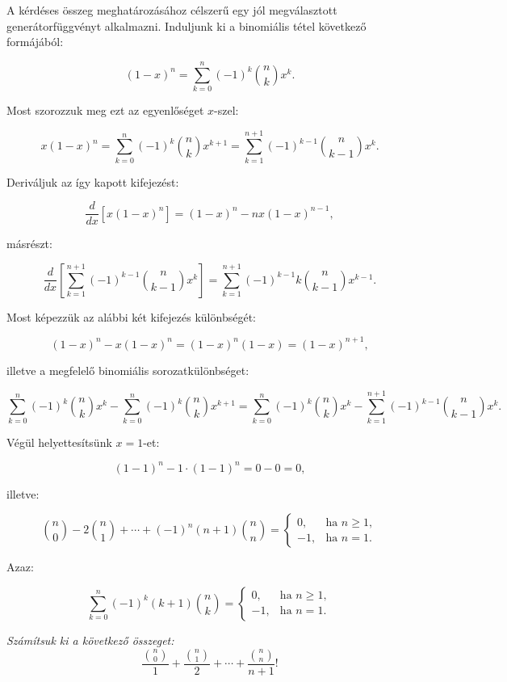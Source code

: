 \begin{solution}
A kérdéses összeg meghatározásához célszerű egy
jól megválasztott generátorfüggvényt alkalmazni. Induljunk ki a binomiális
tétel következő formájából:

\[
(1-x)^{n}=\sum_{k=0}^{n}(-1)^{k}\binom{n}{k}x^{k}.
\]

Most szorozzuk meg ezt az egyenlőséget $x$-szel:

\[
x(1-x)^{n}=\sum_{k=0}^{n}(-1)^{k}\binom{n}{k}x^{k+1}=\sum_{k=1}^{n+1}(-1)^{k-1}\binom{n}{k-1}x^{k}.
\]

Deriváljuk az így kapott kifejezést:

\[
\frac{d}{dx}\left[x(1-x)^{n}\right]=(1-x)^{n}-nx(1-x)^{n-1},
\]

másrészt:

\[
\frac{d}{dx}\left[\sum_{k=1}^{n+1}(-1)^{k-1}\binom{n}{k-1}x^{k}\right]=\sum_{k=1}^{n+1}(-1)^{k-1}k\binom{n}{k-1}x^{k-1}.
\]

Most képezzük az alábbi két kifejezés különbségét:

\[
(1-x)^{n}-x(1-x)^{n}=(1-x)^{n}(1-x)=(1-x)^{n+1},
\]

illetve a megfelelő binomiális sorozatkülönbséget:

\[
\sum_{k=0}^{n}(-1)^{k}\binom{n}{k}x^{k}-\sum_{k=0}^{n}(-1)^{k}\binom{n}{k}x^{k+1}=\sum_{k=0}^{n}(-1)^{k}\binom{n}{k}x^{k}-\sum_{k=1}^{n+1}(-1)^{k-1}\binom{n}{k-1}x^{k}.
\]

Végül helyettesítsünk $x=1$-et:

\[
(1-1)^{n}-1\cdot(1-1)^{n}=0-0=0,
\]

illetve:

\[
\binom{n}{0}-2\binom{n}{1}+\cdots+(-1)^{n}(n+1)\binom{n}{n}=\begin{cases}
0, & \text{ha }n\geq1,\\
-1, & \text{ha }n=1.
\end{cases}
\]

Azaz:

\[
\sum_{k=0}^{n}(-1)^{k}(k+1)\binom{n}{k}=\begin{cases}
0, & \text{ha }n\geq1,\\
-1, & \text{ha }n=1.
\end{cases}
\]
\end{solution}
\begin{extraproblem}
\textit{\emph{Számítsuk ki a következő összeget:}}\emph{ 
\[
\frac{\binom{n}{0}}{1}+\frac{\binom{n}{1}}{2}+\cdots+\frac{\binom{n}{n}}{n+1}!
\]
}
\end{extraproblem}

